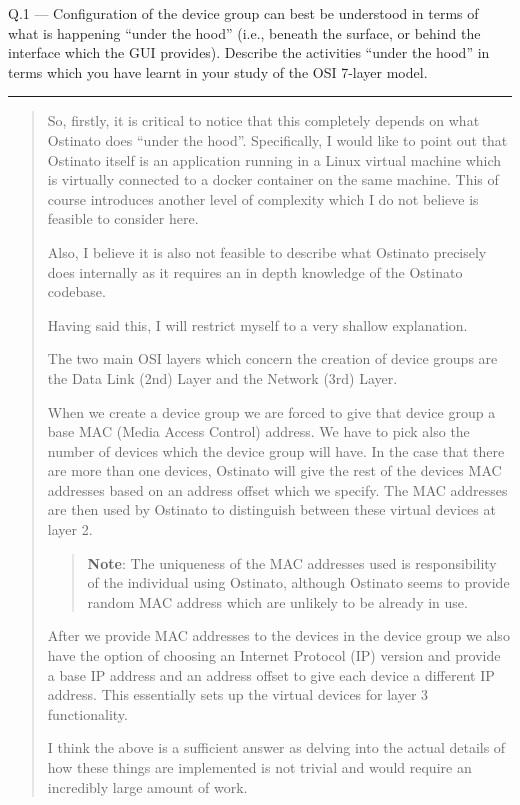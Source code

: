 \documentclass{article}
\newcommand\Que[2]{%
   \begin{samepage}
   \leavevmode\par
   \noindent
   Q.#1 --- #2\par\vspace{10pt}\hrule\vspace{10pt}
   \end{samepage}}
\newenvironment{ans}
   {\fbox{Answer}\begin{quote}}
   {\end{quote}}
\begin{document}
\Que{1}{Configuration of the device group can best be understood
   in terms of what is happening ``under the hood'' (i.e.,
   beneath the surface, or behind the interface which the GUI
   provides). Describe the activities ``under the hood'' in
terms which you have learnt in your study of the OSI 7-layer
model.}

\begin{ans}
So, firstly, it is critical to notice that this completely
depends on what Ostinato does ``under the hood''. Specifically,
I would like to point out that Ostinato itself is an application
running in a Linux virtual machine which is virtually connected
to a docker container on the same machine. This of course
introduces another level of complexity which I do not believe is
feasible to consider here.

Also, I believe it is also not feasible to describe what
Ostinato precisely does internally as it requires an in depth
knowledge of the Ostinato codebase.

Having said this, I will restrict myself to a very shallow
explanation.

The two main OSI layers which concern the creation of device
groups are the Data Link (2nd) Layer and the Network (3rd)
Layer.

When we create a device group we are forced to give that device
group a base MAC (Media Access Control) address. We have to pick
also the number of devices which the device group will have. In
the case that there are more than one devices, Ostinato will
give the rest of the devices MAC addresses based on an address
offset which we specify. The MAC addresses are then used by
Ostinato to distinguish between these virtual devices at layer
2.

\begin{quote}
\textbf{Note}: The uniqueness of the MAC addresses used is
responsibility of the individual using Ostinato, although
Ostinato seems to provide random MAC address which are unlikely
to be already in use.
\end{quote}

After we provide MAC addresses to the devices in the device
group we also have the option of choosing an Internet Protocol
(IP) version and provide a base IP address and an address offset
to give each device a different IP address. This essentially
sets up the virtual devices for layer 3 functionality.

I think the above is a sufficient answer as delving into the
actual details of how these things are implemented is not
trivial and would require an incredibly large amount of work.
\end{ans}
\end{document}
